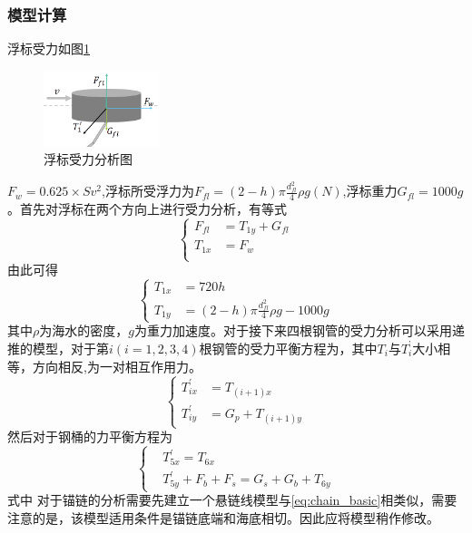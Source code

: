 \documentclass{cumcm}
\begin{document}
\subsubsection{模型计算}
浮标受力如图\ref{fig:float}
\begin{figure}[H]
	\centering
	\includegraphics*[width=0.3\textwidth]{img/float.png}
	\caption{浮标受力分析图}
	\label{fig:float}
\end{figure}
$F_w=0.625\times Sv^2$,浮标所受浮力为$F_{fl}=(2-h)\pi \frac{d_{fl}^2}{4} \rho  g(N)$,浮标重力$G_{fl}=1000g$。首先对浮标在两个方向上进行受力分析，有等式
\begin{displaymath}
\left\{
\begin{aligned}
	F_{fl} &=T_{1y}+G_{fl}\\
	T_{1x} &=F_w\\
\end{aligned}
\right.
\end{displaymath}
由此可得
\begin{displaymath}
\left\{
\begin{aligned}
	T_{1x} &=720h\\
	T_{1y} &=(2-h)\pi \frac{d_{fl}^2}{4} \rho g-1000g
\end{aligned}
\right.
\end{displaymath}
其中$\rho$为海水的密度，$g$为重力加速度。对于接下来四根钢管的受力分析可以采用递推的模型，对于第$i(i=1,2,3,4)$根钢管的受力平衡方程为，其中$T_i$与$T_i^{’}$大小相等，方向相反,为一对相互作用力。
\begin{displaymath}
\left\{
\begin{aligned}
	T_{ix}^{'}&=T_{(i+1)x}\\
	T_{iy}^{'}&=G_p+T_{(i+1)y}
\end{aligned}
\right.
\end{displaymath}
然后对于钢桶的力平衡方程为
\begin{displaymath}
\left\{
\begin{aligned}
	&T_{5x}^{'}=T_{6x}\\
	&T_{5y}^{'}+F_b+F_s=G_s+G_b+T_{6y}
\end{aligned}
\right.
\end{displaymath}
式中
对于锚链的分析需要先建立一个悬链线模型与\ref{eq:chain_basic}相类似，需要注意的是，该模型适用条件是锚链底端和海底相切。因此应将模型稍作修改。
\end{document}
